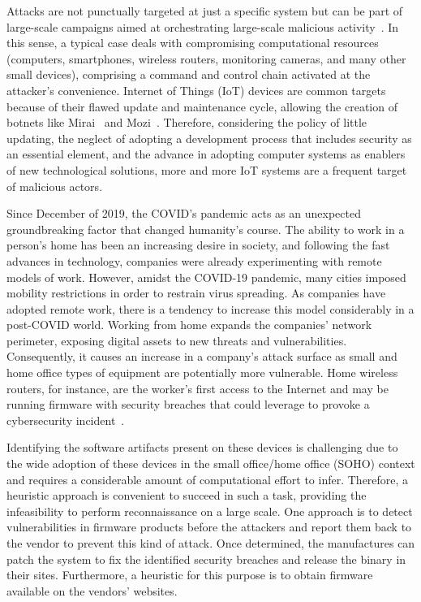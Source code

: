 Attacks are not punctually targeted at just a specific system but can be part of large-scale campaigns aimed at orchestrating large-scale malicious activity~\cite{iotbotnet}. In this sense, a typical case deals with compromising computational resources (computers, smartphones, wireless routers, monitoring cameras, and many other small devices), comprising a command and control chain activated at the attacker's convenience. Internet of Things (IoT) devices are common targets because of their flawed update and maintenance cycle, allowing the creation of botnets like Mirai~\cite{mirai} and Mozi~\cite{mozi}. Therefore, considering the policy of little updating, the neglect of adopting a development process that includes security as an essential element, and the advance in adopting computer systems as enablers of new technological solutions, more and more IoT systems are a frequent target of malicious actors.

Since December of 2019, the COVID's pandemic acts as an unexpected groundbreaking factor that changed humanity's course.  The ability to work in a person's home has been an increasing desire in society, and following the fast advances in technology, companies were already experimenting with remote models of work. However, amidst the COVID-19 pandemic, many cities imposed mobility restrictions in order to restrain virus spreading.  As companies have adopted remote work, there is a tendency to increase this model considerably in a post-COVID world.  Working from home expands the companies' network perimeter, exposing digital assets to new threats and vulnerabilities. Consequently, it causes an increase in a company's attack surface as small and home office types of equipment are potentially more vulnerable. Home wireless routers, for instance, are the worker's first access to the Internet and may be running firmware with security breaches that could leverage to provoke a cybersecurity incident~\cite{soho}.

Identifying the software artifacts present on these devices is challenging due to the wide adoption of these devices in the small office/home office (SOHO) context and requires a considerable amount of computational effort to infer. Therefore, a heuristic approach is convenient to succeed in such a task, providing the infeasibility to perform reconnaissance on a large scale. One approach is to detect vulnerabilities in firmware products before the attackers and report them back to the vendor to prevent this kind of attack. Once determined, the manufactures can patch the system to fix the identified security breaches and release the binary in their sites.  Furthermore, a heuristic for this purpose is to obtain firmware available on the vendors' websites.  


